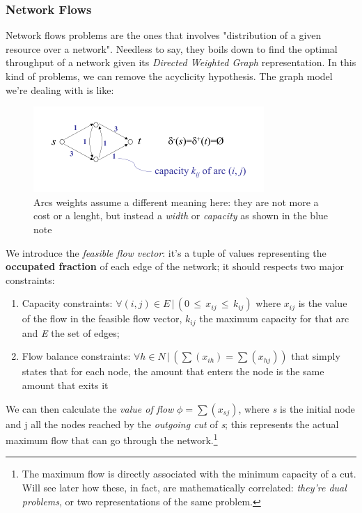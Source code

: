 \documentclass{article}
\begin{document}
			\subsubsection{Network Flows}
				Network flows problems are the ones that involves "distribution of a given resource over a network". Needless to say, they boils down to find the optimal throughput of a network given its \textit{Directed Weighted Graph} representation. In this kind of problems, we can remove the acyclicity hypothesis. The graph model we're dealing with is like:
				\begin{figure}[H]
					\centering
					\includegraphics[width = \textwidth]{./images/Flows.png}
					\caption{Arcs weights assume a different meaning here: they are not more a cost or a lenght, but instead a \textit{width} or \textit{capacity} as shown in the blue note}
				\end{figure}
				We introduce the \textit{feasible flow vector}: it's a tuple of values representing the \textbf{occupated fraction} of each edge of the network; it should respects two major constraints:
				\begin{enumerate}
					\item Capacity constraints: $\forall (i, j) \in E\, |\, (0\, \leq\, x_{ij}\, \leq\, k_{ij} )$ where $x_{ij}$ is the value of the flow in the feasible flow vector, $k_{ij}$ the maximum capacity for that arc and \emph{E} the set of edges;
					\item Flow balance constraints: $\forall h \in N\, |\, (\sum(x_{ih}) = \sum(x_{hj}))$ that simply states that for each node, the amount that enters the node is the same amount that exits it
				\end{enumerate}
				We can then calculate the \textit{value of flow} $\phi = \sum(x_{sj})$, where \emph{s} is the initial node and j all the nodes reached by the \textit{outgoing cut} of \emph{s}; this represents the actual maximum flow that can go through the network.\footnote{The maximum flow is directly associated with the minimum capacity of a cut. Will see later how these, in fact, are mathematically correlated: \textit{they're dual problems}, or two representations of the same problem.}
\end{document}

